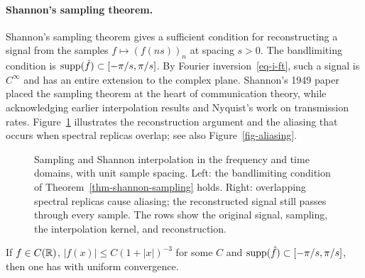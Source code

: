 \paragraph{Shannon's sampling theorem.}

Shannon's sampling theorem gives a sufficient condition for reconstructing a signal from the samples $f \mapsto (f(ns))_n$ at spacing $s>0$.
%
The bandlimiting condition is $\operatorname{supp}(\hat f) \subset [-\pi/s,\pi/s]$. By Fourier inversion~\eqref{eq-i-ft}, such a signal is $C^\infty$ and has an entire extension to the complex plane.
%
Shannon's 1949 paper placed the sampling theorem at the heart of communication theory, while acknowledging earlier interpolation results and Nyquist's work on transmission rates.
%
Figure~\ref{fig-sampling-aliasing} illustrates the reconstruction argument and the aliasing that occurs when spectral replicas overlap; see also Figure~\ref{fig-aliasing}.

\begin{figure}[tbp]
\centering
{}
\caption{Sampling and Shannon interpolation in the frequency and time domains, with unit sample spacing. Left: the bandlimiting condition of Theorem~\ref{thm-shannon-sampling} holds. Right: overlapping spectral replicas cause aliasing; the reconstructed signal still passes through every sample. The rows show the original signal, sampling, the interpolation kernel, and reconstruction.}
\label{fig-sampling-aliasing}
\end{figure}





\begin{thm} \label{thm-shannon-sampling}
	If $f\in C(\mathbb{R})$, $|f(x)| \leq C(1+|x|)^{-3}$ for some $C$ and $\operatorname{supp}(\hat f) \subset [-\pi/s,\pi/s]$, then one has
	with uniform convergence.
\end{thm}

